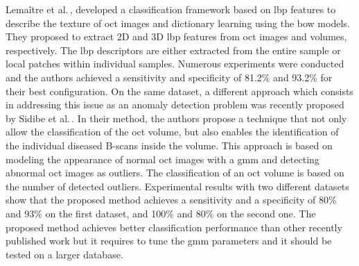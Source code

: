 Lemaître et al.\,\cite{lemaitre2015}, developed a classification framework  based on \gls{lbp} features to describe the texture of \gls{oct} images and dictionary learning using the \gls{bow} models.
They proposed to extract 2D and 3D \gls{lbp} features from \gls{oct} images and volumes, respectively.
The \gls{lbp} descriptors are either extracted from the entire sample or local patches within individual samples.
Numerous experiments were conducted and the authors achieved a sensitivity and specificity of 81.2\% and 93.2\% for their best configuration.
On the same dataset, a different approach which consists in  addressing this issue as an anomaly detection problem was recently proposed by Sidibe et al.\,\cite{sankar2016}.
In their method, the authors propose a technique that not only allow the classification of the \gls{oct} volume, but also enables the identification of the individual diseased B-scans inside the volume.
This approach is based on modeling the appearance of normal \gls{oct} images with a \gls{gmm} and detecting abnormal \gls{oct} images as outliers.
The classification of an \gls{oct} volume is based on the number of detected outliers.
Experimental results with two different datasets show that the proposed method achieves a sensitivity and a specificity of 80\% and 93\% on the first dataset, and 100\% and 80\% on the second one.
The proposed method achieves better classification performance than other recently published work but it requires to tune the \gls{gmm} parameters and it should be tested on a larger database.





